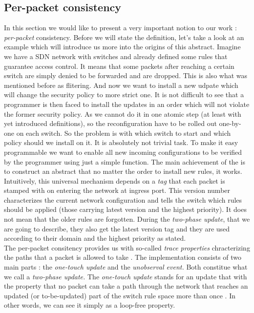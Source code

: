 \documentclass{article}
\theoremstyle{remark}
\begin{document}
\subsection{Per-packet consistency}
In this section we would like to present a very important notion to our work : \emph{per-packet} consistency. Before we will state the  definition, let's take a look at an example which will introduce us more into the origins of this abstract.
Imagine we have a SDN network with switches and already defined some rules that guarantee  access control. It means that some packets after reaching a certain switch are simply denied to be forwarded and are dropped. This is also what was mentioned before as flitering. And now we want to install a new udpate which will change  the security policy to more strict one. It is not difficult to see that a programmer is then faced to install the updates in an order which will not violate the former security policy. As we cannot do it in one atomic step (at least with yet introduced definitions), so the reconfiguration have to be rolled out one-by-one on each switch. So the problem is with which switch to start and which policy should we install on it. It is absolutely not trivial task.
To make it easy programmable we want to enable all new incoming configurations to be verified by the programmer using just a simple function. The main achievement of the \cite{Reitblatt:2012:ANU:2342356.2342427} is to construct an abstract that no matter the order to install new rules, it works. Intuitively, this universal mechanism depends on a \emph{tag} that each packet is stamped with on entering the network at ingress port. This version number characterizes the current network configuration and tells the switch which rules should be applied (those carrying latest version and the highest priority). It does not mean that the older rules are forgotten. During the \emph{two-phase update}, that we are going to describe, they also get the latest version tag and they are used according to their domain and the highest priority as stated.\\
The per-packet consitency provides us with so-called \emph{trace properties} chracterizing the paths that a packet is allowed to take \cite{Reitblatt:2012:ANU:2342356.2342427}. 
The implementation consists of two main parts : the \emph{one-touch update} and the \emph{unobserval event.} Both constitue what we call a \emph{two-phase update.} 
The \emph{one-touch update} stands for an update that with the property that no packet can take a path through the network that reaches an updated (or to-be-updated) part of the switch rule space more than once \cite{Reitblatt:2012:ANU:2342356.2342427}. In other words, we can see it simply as a loop-free property.
\end{document}
